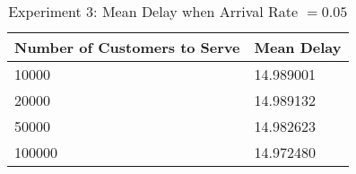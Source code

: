 \begin{table}[h]
	\centering
	\begin{tabular}{|l|l|}\hline
		Number of Customers to Serve & Mean Delay \\\hline
		10000                        & 14.989001  \\\hline
		20000                        & 14.989132  \\\hline
		50000                        & 14.982623  \\\hline
		100000                       & 14.972480  \\\hline
	\end{tabular}         
	\caption{Experiment 3: Mean Delay when Arrival Rate $= 0.05$}
	\label{table:exp3arr5}
\end{table}